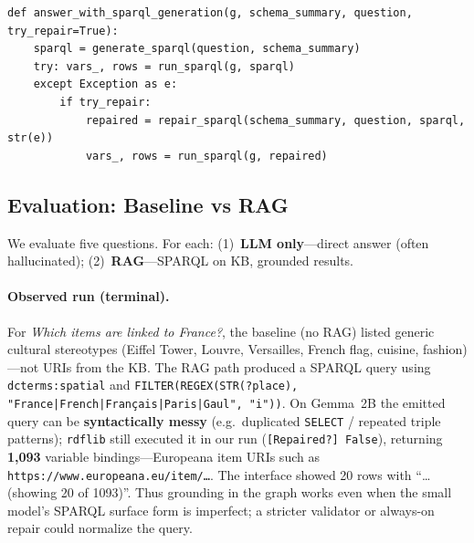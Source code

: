 \documentclass[11pt,a4paper]{article}
\begin{document}
\begin{lstlisting}[caption={Self-repair: error -> LLM -> corrected query}]
def answer_with_sparql_generation(g, schema_summary, question, try_repair=True):
    sparql = generate_sparql(question, schema_summary)
    try: vars_, rows = run_sparql(g, sparql)
    except Exception as e:
        if try_repair:
            repaired = repair_sparql(schema_summary, question, sparql, str(e))
            vars_, rows = run_sparql(g, repaired)
\end{lstlisting}

\subsection{Evaluation: Baseline vs RAG}

We evaluate five questions. For each: (1)~\textbf{LLM only}---direct answer (often hallucinated); (2)~\textbf{RAG}---SPARQL on KB, grounded results.

\paragraph{Observed run (terminal).} For \emph{Which items are linked to France?}, the baseline (no RAG) listed generic cultural stereotypes (Eiffel Tower, Louvre, Versailles, French flag, cuisine, fashion)---not URIs from the KB. The RAG path produced a SPARQL query using \texttt{dcterms:spatial} and \texttt{FILTER(REGEX(STR(?place), "France|French|Fran\c{c}ais|Paris|Gaul", "i"))}. On Gemma~2B the emitted query can be \textbf{syntactically messy} (e.g.\ duplicated \texttt{SELECT} / repeated triple patterns); \texttt{rdflib} still executed it in our run (\texttt{[Repaired?] False}), returning \textbf{1,093} variable bindings---Europeana item URIs such as \texttt{https://www.europeana.eu/item/\ldots}. The interface showed 20 rows with ``\ldots (showing 20 of 1093)''. Thus grounding in the graph works even when the small model's SPARQL surface form is imperfect; a stricter validator or always-on repair could normalize the query.
\end{document}
